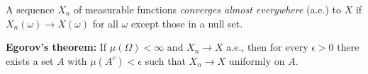 A sequence $X_n$ of measurable functions \textit{converges almost everywhere} (a.e.) to $X$ if $X_n(\omega) \to X(\omega)$ for all $\omega$ except those in a null set.

\textbf{Egorov's theorem:} If $\mu(\Omega) < \infty$ and $X_n \to X$ a.e., then for every $\epsilon > 0$ there exists a set $A$ with $\mu(A^c) < \epsilon$ such that $X_n \to X$ uniformly on $A$.
